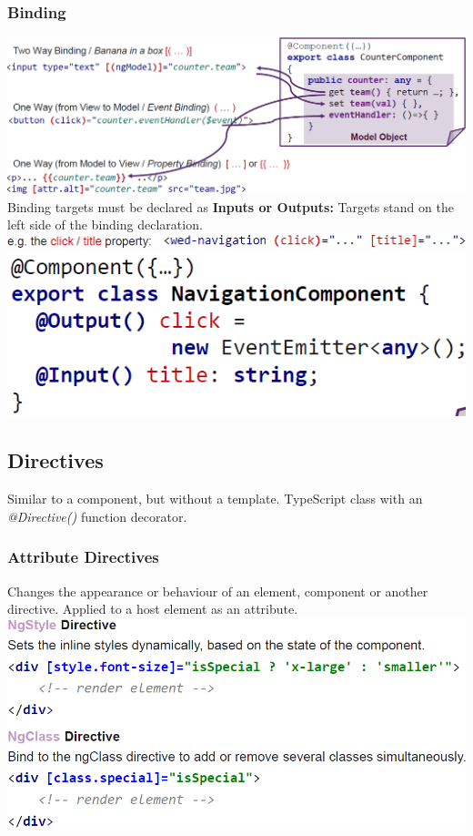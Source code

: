 \subsubsection{Binding}
\includegraphics[width=\linewidth]{img/angular_bindings.png}
Binding targets must be declared as \textbf{Inputs or Outputs:} Targets stand on the left side of the binding declaration.
\includegraphics[width=\linewidth]{img/angular_input_output_properties.png}
\includegraphics[width=0.5\linewidth]{img/angular_input_output_properties2.png}

\subsection{Directives}
Similar to a component, but without a template.
TypeScript class with an \textit{@Directive()} function decorator.
\subsubsection{Attribute Directives}
Changes the appearance or behaviour of an element, component or another directive.
Applied to a host element as an attribute.
\includegraphics[width=0.6\linewidth]{img/angular_attribute_directives.png}
